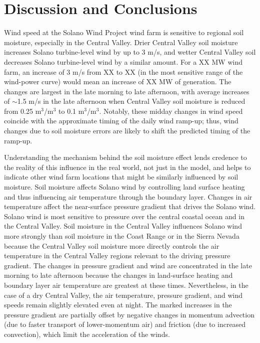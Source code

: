 
\section{Discussion and Conclusions}

Wind speed at the Solano Wind Project wind farm is sensitive to regional soil moisture, especially in the Central Valley.  Drier Central Valley soil moisture increases Solano turbine-level wind by up to 3 m/s, and wetter Central Valley soil decreases Solano turbine-level wind by a similar amount.  For a XX MW wind farm, an increase of 3 m/s from XX to XX (in the most sensitive range of the wind-power curve) would mean an increase of XX MW of generation.  The changes are largest in the late morning to late afternoon, with average increases of $\sim$1.5 m/s in the late afternoon when Central Valley soil moisture is reduced from 0.25 m$^3$/m$^3$ to 0.1 m$^3$/m$^3$.  Notably, these midday changes in wind speed coincide with the approximate timing of the daily wind ramp-up; thus, wind changes due to soil moisture errors are likely to shift the predicted timing of the ramp-up.

Understanding the mechanism behind the soil moisture effect lends credence to the reality of this influence in the real world, not just in the model, and helps to indicate other wind farm locations that might be similarly influenced by soil moisture.  Soil moisture affects Solano wind by controlling land surface heating and thus influencing air temperature through the boundary layer.  Changes in air temperature affect the near-surface pressure gradient that drives the Solano wind.  Solano wind is most sensitive to pressure over the central coastal ocean and in the Central Valley.  Soil moisture in the Central Valley influences Solano wind more strongly than soil moisture in the Coast Range or in the Sierra Nevada because the Central Valley soil moisture more directly controls the air temperature in the Central Valley regions relevant to the driving pressure gradient.  The changes in pressure gradient and wind are concentrated in the late morning to late afternoon because the changes in land-surface heating and boundary layer air temperature are greatest at these times.  Nevertheless, in the case of a dry Central Valley, the air temperature, pressure gradient, and wind speeds remain slightly elevated even at night.  The marked increases in the pressure gradient are partially offset by negative changes in momentum advection (due to faster transport of lower-momentum air) and friction (due to increased convection), which limit the acceleration of the winds.

